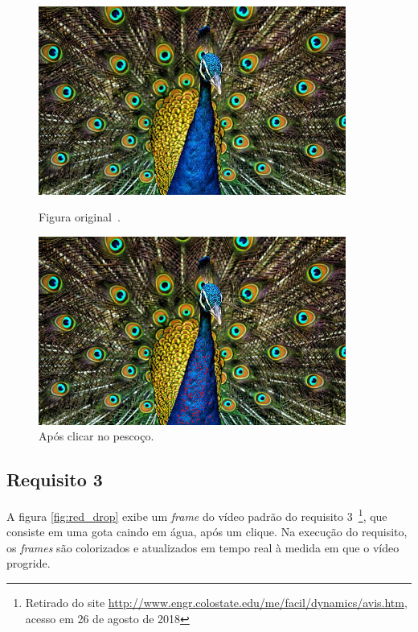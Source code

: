 \documentclass{bmvc2k}
\begin{document}
\begin{figure}[htb]
    \centering
    \begin{minipage}{0.45\textwidth}
        \centering
        \includegraphics[width=0.9\textwidth]{Figs/peacock.jpg}
        \caption{Figura original~\cite{wiki:pavao}.}
        \label{fig:pavão}
    \end{minipage}\hfill
    \begin{minipage}{0.45\textwidth}
        \centering
        \includegraphics[width=0.9\textwidth]{Figs/red_peacock.png}
        \caption{Após clicar no pescoço.}
        \label{fig:red_pavão}
    \end{minipage}
\end{figure}

\subsection{Requisito 3}
A figura \ref{fig:red_drop} exibe um \textit{frame} do vídeo padrão do requisito 3~\footnote{Retirado do site \href{http://www.engr.colostate.edu/me/facil/dynamics/avis.htm}{http://www.engr.colostate.edu/me/facil/dynamics/avis.htm}, acesso em 26 de agosto de 2018}, que consiste em uma gota caindo em água, após um clique. Na execução do requisito, os \textit{frames} são colorizados e atualizados em tempo real à medida em que o vídeo progride.
\end{document}
